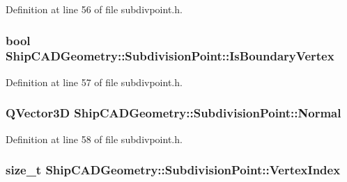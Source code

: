 Definition at line 56 of file subdivpoint.\-h.

\hypertarget{classShipCADGeometry_1_1SubdivisionPoint_af9d5dfd7c9c8bea01aab36388f0f0afe}{
\subsubsection[{Is\-Boundary\-Vertex}]{\setlength{\rightskip}{0pt plus 5cm}bool Ship\-C\-A\-D\-Geometry\-::\-Subdivision\-Point\-::\-Is\-Boundary\-Vertex\hspace{0.3cm}{\ttfamily [read]}}}\label{classShipCADGeometry_1_1SubdivisionPoint_af9d5dfd7c9c8bea01aab36388f0f0afe}


Definition at line 57 of file subdivpoint.\-h.

\hypertarget{classShipCADGeometry_1_1SubdivisionPoint_a547c0cb9b9641fcb9d6a5beb3a86d59c}{
\subsubsection[{Normal}]{\setlength{\rightskip}{0pt plus 5cm}Q\-Vector3\-D Ship\-C\-A\-D\-Geometry\-::\-Subdivision\-Point\-::\-Normal\hspace{0.3cm}{\ttfamily [read]}}}\label{classShipCADGeometry_1_1SubdivisionPoint_a547c0cb9b9641fcb9d6a5beb3a86d59c}


Definition at line 58 of file subdivpoint.\-h.

\hypertarget{classShipCADGeometry_1_1SubdivisionPoint_a3603dcd95c922b3852e0ba6f95a08b7f}{
\subsubsection[{Vertex\-Index}]{\setlength{\rightskip}{0pt plus 5cm}size\-\_\-t Ship\-C\-A\-D\-Geometry\-::\-Subdivision\-Point\-::\-Vertex\-Index\hspace{0.3cm}{\ttfamily [read]}}}\label{classShipCADGeometry_1_1SubdivisionPoint_a3603dcd95c922b3852e0ba6f95a08b7f}


